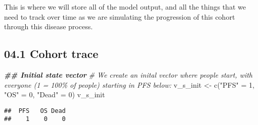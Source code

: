 \documentclass[
]{article}
\newenvironment{Shaded}{\begin{snugshade}}{\end{snugshade}}
\newcommand{\CommentTok}[1]{\textcolor[rgb]{0.56,0.35,0.01}{\textit{#1}}}
\newcommand{\DecValTok}[1]{\textcolor[rgb]{0.00,0.00,0.81}{#1}}
\newcommand{\DocumentationTok}[1]{\textcolor[rgb]{0.56,0.35,0.01}{\textbf{\textit{#1}}}}
\newcommand{\FunctionTok}[1]{\textcolor[rgb]{0.00,0.00,0.00}{#1}}
\newcommand{\NormalTok}[1]{#1}
\newcommand{\OtherTok}[1]{\textcolor[rgb]{0.56,0.35,0.01}{#1}}
\newcommand{\StringTok}[1]{\textcolor[rgb]{0.31,0.60,0.02}{#1}}
\begin{document}
This is where we will store all of the model output, and all the things
that we need to track over time as we are simulating the progression of
this cohort through this disease process.

\hypertarget{cohort-trace}{%
\subsection{04.1 Cohort trace}\label{cohort-trace}}

\begin{Shaded}
\begin{Highlighting}[]
\DocumentationTok{\#\# Initial state vector}
\CommentTok{\# We create an inital vector where people start, with everyone (1 = 100\% of people) starting in PFS below:}
\NormalTok{v\_s\_init }\OtherTok{\textless{}{-}} \FunctionTok{c}\NormalTok{(}\StringTok{"PFS"} \OtherTok{=} \DecValTok{1}\NormalTok{, }\StringTok{"OS"} \OtherTok{=} \DecValTok{0}\NormalTok{, }\StringTok{"Dead"} \OtherTok{=} \DecValTok{0}\NormalTok{)  }
\NormalTok{v\_s\_init}
\end{Highlighting}
\end{Shaded}

\begin{verbatim}
##  PFS   OS Dead 
##    1    0    0
\end{verbatim}
\end{document}
